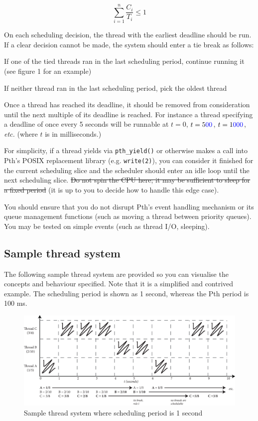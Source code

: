 \documentclass[12pt,a4paper]{article}
\begin{document}
\begin{displaymath}
\sum_{i=1}^{n} \frac{C_i}{T_i} \leq 1
\end{displaymath}

On each scheduling decision, the thread with the earliest deadline should be
run. If a clear decision cannot be made, the system should enter a tie break as
follows:

\begin{compactenum}
    \item If one of the tied threads ran in the last scheduling period,
    continue running it (see figure 1 for an example)
    \item If neither thread ran in the last scheduling period, pick the oldest
    thread
\end{compactenum}

Once a thread has reached its deadline, it should be removed from consideration until
the next multiple of its deadline is reached. For instance a thread specifying a deadline
of once every 5 seconds will be runnable at $t=0$, $t=5{\color{blue}00}$, $t=1{\color{blue}000}$, \textit{etc.} {\color{blue}(where $t$ is in milliseconds.)}

For simplicity, if a thread yields via \texttt{pth\_yield()} or otherwise makes
a call into Pth's {\color{blue}POSIX replacement} library {\color{blue}(e.g. \texttt{write(2)})}, you can consider it finished for the current
scheduling slice and the scheduler should enter an idle loop until the next
scheduling slice. {\color{blue}\sout{Do not spin the CPU here; it may be sufficient to sleep for a
fixed period}} (it is up to you to decide how to handle this edge case).

You should ensure that you do not disrupt Pth's event handling mechanism or its
queue management functions (such as moving a thread between priority queues).
You may be tested on simple events (such as thread I\slash O, sleeping).

\subsection*{Sample thread system}

The following sample thread system are provided so you can visualise the
concepts and behaviour specified. Note that it is a simplified and contrived
example. The scheduling period is shown as 1 second, whereas the Pth period is
100 ms.

\begin{figure}[htb]
    \includegraphics[scale=0.75]{example-system1.eps}
    \caption{Sample thread system where scheduling period is 1 second}
    \label{sample1}
\end{figure}
\end{document}
